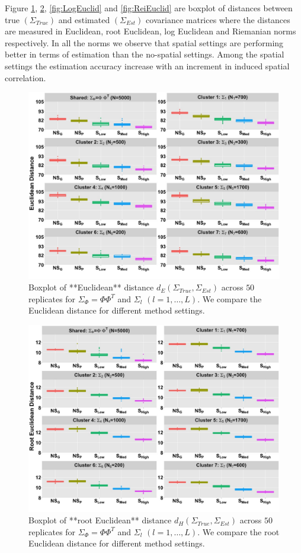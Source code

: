 \documentclass[
]{book}
\begin{document}
Figure \ref{fig:Euclid}, \ref{fig:RootEuclid}, \ref{fig:LogEuclid} and \ref{fig:ReiEuclid} are boxplot of distances between true \((\Sigma_{True})\) and estimated \((\Sigma_{Est})\) covariance matrices where the distances are measured in Euclidean, root Euclidean, log Euclidean and Riemanian norms \citep{dryden2009non} respectively. In all the norms we observe that spatial settings are performing better in terms of estimation than the no-spatial settings. Among the spatial settings the estimation accuracy increase with an increment in induced spatial correlation.

\begin{figure}

{\centering \includegraphics[width=0.8\linewidth]{images/Distance_Euclidean_plot} 

}

\caption{Boxplot of **Euclidean** distance $d_E(\Sigma_{True}, \Sigma_{Est})$ across  $50$ replicates for $\Sigma_{\Phi} = \Phi \Phi^{T}$ and $\Sigma_{l}$ $(l = 1, \dots , L)$. We compare the Euclidean distance for different method settings.}\label{fig:Euclid}
\end{figure}

\begin{figure}

{\centering \includegraphics[width=0.8\linewidth]{images/Root_Euclidean_plot} 

}

\caption{Boxplot of **root Euclidean** distance $d_{H}(\Sigma_{True}, \Sigma_{Est})$ across  $50$ replicates for $\Sigma_{\Phi} = \Phi \Phi^{T}$ and $\Sigma_{l}$ $(l = 1, \dots , L)$. We compare the root Euclidean distance for different method settings.}\label{fig:RootEuclid}
\end{figure}
\end{document}
